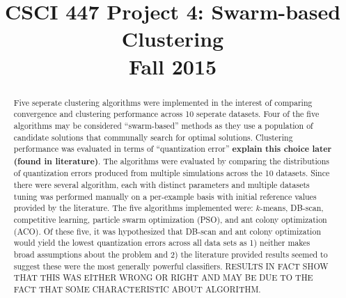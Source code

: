\documentclass[conference]{IEEEtran}
\begin{document}
\title{CSCI 447 Project 4: Swarm-based Clustering \\ Fall 2015}

\author{
  \and
  }

\maketitle

\begin{abstract}
  Five seperate clustering algorithms were implemented in the interest of comparing convergence and clustering performance across 10 seperate datasets. Four of the five algorithms may be considered ``swarm-based'' methods as they use a population of candidate solutions that communally search for optimal solutions. Clustering performance was evaluated in terms of ``quantization error'' \textbf{explain this choice later (found in literature)}. The algorithms were evaluated by comparing the distributions of quantization errors produced from multiple simulations across the 10 datasets. Since there were several algorithm, each with distinct parameters and multiple datasets tuning was performed manually on a per-example basis with initial reference values provided by the literature. The five algorithms implemented were: $k$-means, DB-scan, competitive learning, particle swarm optimization (PSO), and ant colony optimization (ACO). Of these five, it was hypothesized that DB-scan and ant colony optimization would yield the lowest quantization errors across all data sets as 1) neither makes broad assumptions about the problem and 2) the literature provided results seemed to suggest these were the most generally powerful classifiers. RESULTS IN FACT SHOW THAT THIS WAS EITHER WRONG OR RIGHT AND MAY BE DUE TO THE FACT THAT SOME CHARACTERISTIC ABOUT ALGORITHM.
  
\end{abstract}
\end{document}
